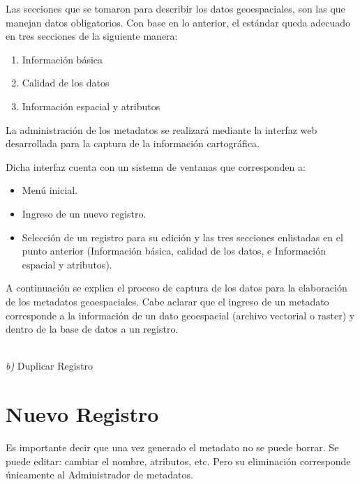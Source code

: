 \documentclass[twoside]{book}
\begin{document}
Las secciones que se tomaron para describir los datos geoespaciales, son las que manejan datos obligatorios. Con base en lo anterior, el estándar queda adecuado en tres secciones de la siguiente manera:
\begin{enumerate}
\item Información básica
\item Calidad de los datos
\item Información espacial y atributos
\end{enumerate}
	
La administración de los metadatos se realizará mediante la interfaz web desarrollada para la captura de la información cartográfica.

Dicha interfaz cuenta con un sistema de ventanas que corresponden a: 

\begin{itemize}
	\item Menú inicial.
	\item Ingreso de un nuevo registro.
	\item Selección de  un registro para su edición y las tres secciones enlistadas en el punto anterior (Información básica,  calidad de los datos, e Información espacial y atributos).
\end{itemize}

A continuación se explica el proceso de captura de los datos para la elaboración de los metadatos geoespaciales. Cabe aclarar que el ingreso de un metadato corresponde a la información de un dato geoespacial (archivo vectorial o raster) y dentro de la base de datos a un registro. 

\\
\textit{b)} Duplicar Registro

\section{Nuevo Registro}

Es importante decir que una vez generado el metadato no se puede borrar. Se puede editar: cambiar el nombre, atributos, etc. Pero su eliminación corresponde únicamente al Administrador de metadatos.
\end{document}
